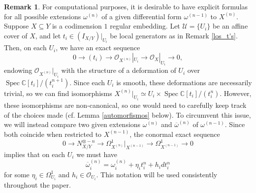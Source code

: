 \documentclass[reqno]{amsart}
\theoremstyle{plain}
\newcommand\C{\mathbb{C}}
\newcommand{\OO}{\mathcal{O}}
\DeclareMathOperator{\Spec}{Spec}
\theoremstyle{definition}
\newtheorem{remark}[theorem]{Remark}
\theoremstyle{named}
\begin{document}
\begin{remark} \label{notacion:formasdif}
For computational purposes, it is desirable to have explicit formulas for all possible extensions $\omega^{(n)}$ of a given differential form $\omega^{(n-1)}$ to $X^{(n)}$. Suppose $X\subseteq Y$ is a codimension $1$ regular embedding. Let $\mathcal{U} = \{ U_i \}$ be an affine cover of $X$, and let $t_i \in (I_{X/Y})|_{U_i}$ be local generators as in Remark \ref{los_t's}. Then, on each $U_i$, we have an exact sequence
\[ 0\rightarrow (t_i)\rightarrow \OO_{X^{(n)}}|_{U_i}\rightarrow \OO_X|_{U_i}\rightarrow 0, \]
endowing $\OO_{X^{(n)}}|_{U_i}$ with the structure of a deformation of $U_i$ over $\Spec \mathbb{C}[t_i]/(t_i^{n+1})$. Since each $U_i$ is smooth, these deformations are necessarily trivial, so we can find isomorphisms $X^{(n)}|_{U_i} \simeq U_i\times \Spec \C[t_i]/(t_i^n)$.
However, these isomorphisms are non-canonical, so one would need to carefully keep track of the choices made (cf. Lemma \ref{automorfismos} below). To circumvent this issue, we will instead compare two given extensions $\omega^{(n)}$ and $\overline{\omega}^{(n)}$ of $\omega^{(n-1)}$. Since both coincide when restricted to $X^{(n-1)}$, the conormal exact sequence
\[
0\rightarrow N_{X/Y}^{\otimes - n} \rightarrow \Omega^1_{X^{(n)}}\big|_{X^{(n-1)}}\rightarrow \Omega^1_{X^{(n-1)}}\rightarrow 0
\]
implies that on each $U_i$ we must have 
\begin{equation}
\overline{\omega}^{(n)}_i = \omega^{(n)}_i + \eta_i t_i^n + h_i dt_i^n    
\end{equation}
for some $\eta_i\in \Omega^1_{U_i}$ and $h_i\in \OO_{U_i}$. This notation will be used consistently throughout the paper.
\end{remark}
\end{document}
